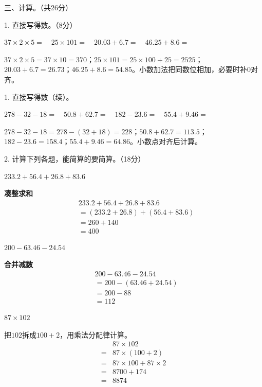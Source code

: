 三、计算。（共26分）\par 1. 直接写得数。（8分）\par \(37\times2\times5=\quad 25\times101=\quad20.03+6.7=\quad46.25+8.6=\)\par
\begin{BookAnswer}
\(37\times2\times5=37\times10=370\)；\allowbreak{}\(25\times101=25\times100+25=2525\)；\allowbreak{}\(20.03+6.7=26.73\)；\allowbreak{}\(46.25+8.6=54.85\)。小数加法把同数位相加，必要时补\(0\)对齐。
\end{BookAnswer}

1. 直接写得数（续）。\par \(278-32-18=\quad50.8+62.7=\quad182-23.6=\quad55.4+9.46=\)\par
\begin{BookAnswer}
\(278-32-18=278-(32+18)=228\)；\allowbreak{}\(50.8+62.7=113.5\)；\allowbreak{}\(182-23.6=158.4\)；\allowbreak{}\(55.4+9.46=64.86\)。小数点对齐后计算。
\end{BookAnswer}

2. 计算下列各题，能简算的要简算。（18分）\par \(233.2+56.4+26.8+83.6\)\par
\begin{BookAnswer}
\textbf{凑整求和}\[\begin{aligned}&233.2+56.4+26.8+83.6\\&=(233.2+26.8)+(56.4+83.6)\\&=260+140\\&=400\end{aligned}\]
\end{BookAnswer}

\(200-63.46-24.54\)\par
\begin{BookAnswer}
\textbf{合并减数}\[\begin{aligned}&200-63.46-24.54\\&=200-(63.46+24.54)\\&=200-88\\&=112\end{aligned}\]
\end{BookAnswer}

\(87\times102\)\par
\begin{BookAnswer}
把\(102\)拆成\(100+2\)，用乘法分配律计算。\[\begin{aligned}&87\times102\\={}&87\times(100+2)\\={}&87\times100+87\times2\\={}&8700+174\\={}&8874\end{aligned}\]
\end{BookAnswer}

